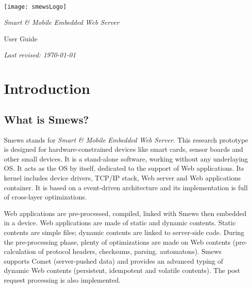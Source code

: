 \documentclass{report}
\begin{document}
\begin{titlepage}


~

\vspace{6cm}

\begin{center}
\texttt{[image: smewsLogo]}
\end{center}

\begin{center}
\LARGE
{\em Smart \& Mobile Embedded Web Server}

User Guide
\end{center}

\vfill

\begin{center}
\em
Last revised: \today
\end{center}

\end{titlepage}

\tableofcontents
 
\chapter{Introduction}

\section{What is Smews?}

Smews stands for \emph{Smart \& Mobile Embedded Web Server}. This research prototype is designed for hardware-constrained devices like smart cards, sensor boards and other small devices. It is a stand-alone software, working without any underlaying OS. It acts as the OS by itself, dedicated to the support of Web applications. Its kernel includes device drivers, TCP/IP stack, Web server and Web applications container. It is based on a event-driven architecture and its implementation is full of cross-layer optimizations.

Web applications are pre-processed, compiled, linked with Smews then embedded in a device. Web applications are made of static and dynamic contents. Static contents are simple files; dynamic contents are linked to server-side code. During the pre-processing phase, plenty of optimizations are made on Web contents (pre-calculation of protocol headers, checksums, parsing. automatons). Smews supports Comet (server-pushed data) and provides an advanced typing of dynamic Web contents (persistent, idempotent and volatile contents). The post request processing is also implemented.
\end{document}
